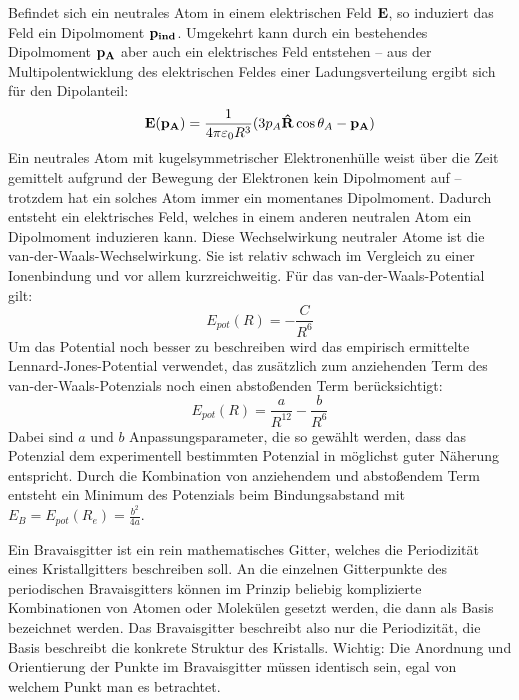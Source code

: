 \label{q:53}

Befindet sich ein neutrales Atom in einem elektrischen Feld $\vb{E}$, so induziert das Feld ein Dipolmoment $\vb{p_{ind}}$. Umgekehrt kann durch ein bestehendes Dipolmoment $\vb{p_A}$ aber auch ein elektrisches Feld entstehen -- aus der Multipolentwicklung des elektrischen Feldes einer Ladungsverteilung ergibt sich für den Dipolanteil:
\begin{equation*}
    \vb{E}(\vb{p_A}) = \frac{1}{4\pi\varepsilon_0 R^3} (3 p_A \vb{\hat{R}} \cos{\theta_A} - \vb{p_A})
\end{equation*}
Ein neutrales Atom mit kugelsymmetrischer Elektronenhülle weist über die Zeit gemittelt aufgrund der Bewegung der Elektronen kein Dipolmoment auf -- trotzdem hat ein solches Atom immer ein momentanes Dipolmoment. Dadurch entsteht ein elektrisches Feld, welches in einem anderen neutralen Atom ein Dipolmoment induzieren kann. Diese Wechselwirkung neutraler Atome ist die van-der-Waals-Wechselwirkung. Sie ist relativ schwach im Vergleich zu einer Ionenbindung und vor allem kurzreichweitig. Für das van-der-Waals-Potential gilt:
\begin{equation}
    E_{pot}(R) = -\frac{C}{R^6}
\end{equation}
Um das Potential noch besser zu beschreiben wird das empirisch ermittelte Lennard-Jones-Potential verwendet, das zusätzlich zum anziehenden Term des van-der-Waals-Potenzials noch einen abstoßenden Term berücksichtigt:
\begin{equation}
    E_{pot}(R) = \frac{a}{R^{12}} - \frac{b}{R^6}
\end{equation}
Dabei sind $a$ und $b$ Anpassungsparameter, die so gewählt werden, dass das Potenzial dem experimentell bestimmten Potenzial in möglichst guter Näherung entspricht. Durch die Kombination von anziehendem und abstoßendem Term entsteht ein Minimum des Potenzials beim Bindungsabstand mit $E_B = E_{pot}(R_e) = \frac{b^2}{4a}$.


\label{q:54}

Ein Bravaisgitter ist ein rein mathematisches Gitter, welches die Periodizität eines Kristallgitters beschreiben soll. An die einzelnen Gitterpunkte des periodischen Bravaisgitters können im Prinzip beliebig komplizierte Kombinationen von Atomen oder Molekülen gesetzt werden, die dann als Basis bezeichnet werden. Das Bravaisgitter beschreibt also nur die Periodizität, die Basis beschreibt die konkrete Struktur des Kristalls. Wichtig: Die Anordnung und Orientierung der Punkte im Bravaisgitter müssen identisch sein, egal von welchem Punkt man es betrachtet.

